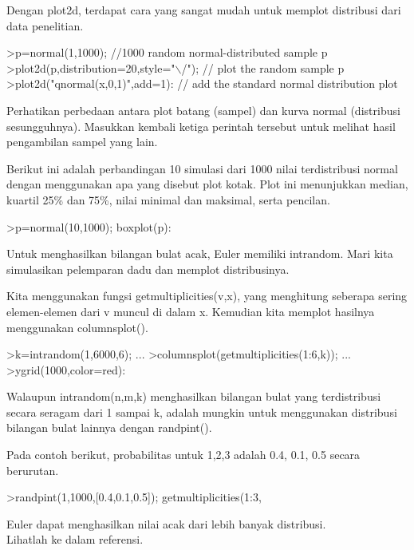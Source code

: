\documentclass{article}
\begin{document}
\begin{eulernotebook}
\begin{eulercomment}
Dengan plot2d, terdapat cara yang sangat mudah untuk memplot
distribusi dari data penelitian.
\end{eulercomment}
\begin{eulerprompt}
>p=normal(1,1000); //1000 random normal-distributed sample p
>plot2d(p,distribution=20,style="\(\backslash\)/"); // plot the random sample p
>plot2d("qnormal(x,0,1)",add=1): // add the standard normal distribution plot
\end{eulerprompt}
\begin{eulercomment}
Perhatikan perbedaan antara plot batang (sampel) dan kurva normal
(distribusi sesungguhnya). Masukkan kembali ketiga perintah tersebut
untuk melihat hasil pengambilan sampel yang lain.
\end{eulercomment}
\begin{eulercomment}
Berikut ini adalah perbandingan 10 simulasi dari 1000 nilai
terdistribusi normal dengan menggunakan apa yang disebut plot kotak.
Plot ini menunjukkan median, kuartil 25\% dan 75\%, nilai minimal dan
maksimal, serta pencilan.
\end{eulercomment}
\begin{eulerprompt}
>p=normal(10,1000); boxplot(p):
\end{eulerprompt}
\begin{eulercomment}
Untuk menghasilkan bilangan bulat acak, Euler memiliki intrandom. Mari
kita simulasikan pelemparan dadu dan memplot distribusinya.


Kita menggunakan fungsi getmultiplicities(v,x), yang menghitung
seberapa sering elemen-elemen dari v muncul di dalam x. Kemudian kita
memplot hasilnya menggunakan columnsplot().
\end{eulercomment}
\begin{eulerprompt}
>k=intrandom(1,6000,6);  ...
>columnsplot(getmultiplicities(1:6,k));  ...
>ygrid(1000,color=red):
\end{eulerprompt}
\begin{eulercomment}
Walaupun intrandom(n,m,k) menghasilkan bilangan bulat yang
terdistribusi secara seragam dari 1 sampai k, adalah mungkin untuk
menggunakan distribusi bilangan bulat lainnya dengan randpint().


Pada contoh berikut, probabilitas untuk 1,2,3 adalah 0.4, 0.1, 0.5
secara berurutan.
\end{eulercomment}
\begin{eulerprompt}
>randpint(1,1000,[0.4,0.1,0.5]); getmultiplicities(1:3,%
\end{eulerprompt}
\begin{euleroutput}
  [378,  102,  520]
\end{euleroutput}
\begin{eulercomment}
Euler dapat menghasilkan nilai acak dari lebih banyak distribusi.\\
Lihatlah ke dalam referensi.


\end{eulercomment}
\end{eulernotebook}
\end{document}
